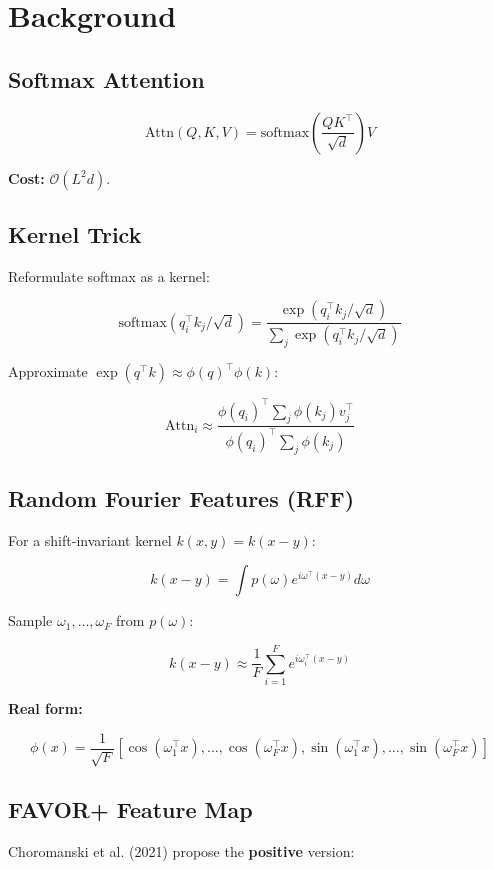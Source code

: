 
\section{Background}

\subsection{Softmax Attention}

\[
\text{Attn}(Q, K, V) = \text{softmax}\!\left(\frac{QK^\top}{\sqrt{d}}\right)V
\tag{3.1}
\]

\textbf{Cost:} $\mathcal{O}(L^2 d)$.

\subsection{Kernel Trick}

Reformulate softmax as a kernel:

\[
\text{softmax}(q_i^\top k_j / \sqrt{d}) = \frac{\exp(q_i^\top k_j / \sqrt{d})}{\sum_j \exp(q_i^\top k_j / \sqrt{d})}
\tag{3.2}
\]

Approximate $\exp(q^\top k) \approx \phi(q)^\top \phi(k)$:

\[
\text{Attn}_i \approx \frac{\phi(q_i)^\top \sum_j \phi(k_j) v_j^\top}{\phi(q_i)^\top \sum_j \phi(k_j)}
\tag{3.3}
\]

\subsection{Random Fourier Features (RFF)}

For a shift-invariant kernel $k(x, y) = k(x - y)$:

\[
k(x - y) = \int p(\omega) e^{i \omega^\top (x - y)} d\omega
\tag{3.4}
\]

Sample $\omega_1, \dots, \omega_F$ from $p(\omega)$:

\[
k(x - y) \approx \frac{1}{F} \sum_{i=1}^{F} e^{i \omega_i^\top (x - y)}
\tag{3.5}
\]

\textbf{Real form:}

\[
\phi(x) = \frac{1}{\sqrt{F}} [\cos(\omega_1^\top x), \dots, \cos(\omega_F^\top x), \sin(\omega_1^\top x), \dots, \sin(\omega_F^\top x)]
\tag{3.6}
\]

\subsection{FAVOR+ Feature Map}

Choromanski et al. (2021) propose the \textbf{positive} version:

